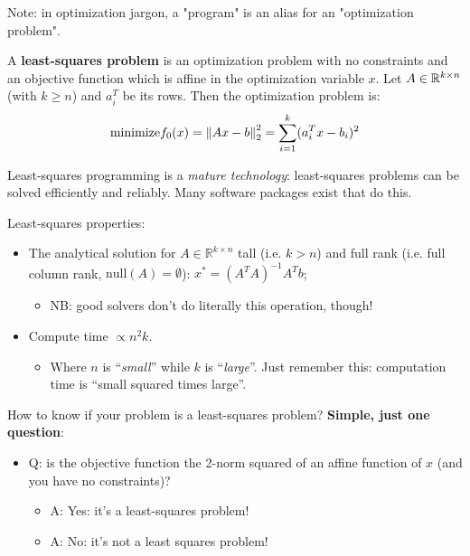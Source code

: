 \begin{Fact}
  Note: in optimization jargon, a "program" is an alias for an "optimization problem".
\end{Fact}


\begin{Definition}
  A \textbf{least-squares problem} is an optimization problem with no constraints and an objective function which is affine in the optimization variable $x$. Let $A\in\mathbb R^{k\times n}$ (with $k\ge n$) and $a_i^T$ be its rows. Then the optimization problem is:
  \begin{equation*}
    \text{minimize} f_0(x) = \left\|Ax-b\right\|_{2}^2 = \sum_{i=1}^k (a_i^Tx-b_i)^2
  \end{equation*}
\end{Definition}

Least-squares programming is a \textit{mature technology}: least-squares problems can be solved efficiently and reliably. Many software packages exist that do this.

\begin{Fact}
  Least-squares properties:
  \begin{itemize}
  \item The analytical solution for $A\in\mathbb R^{k\times n}$ tall (i.e. $k>n$) and full rank (i.e. full column rank, $\text{null}(A)=\emptyset$): $x^*=(A^TA)^{-1}A^Tb$;
    \begin{itemize}
    \item NB: good solvers don't do literally this operation, though!
    \end{itemize}
  \item Compute time $\propto n^2k$.
    \begin{itemize}
    \item Where $n$ is ``\textit{small}'' while $k$ is ``\textit{large}''. Just remember this: computation time is ``small squared times large''.
    \end{itemize}
  \end{itemize}
\end{Fact}

How to know if your problem is a least-squares problem? \textbf{Simple, just one question}:

\begin{itemize}
\item Q: is the objective function the 2-norm squared of an affine function of $x$ (and you have no constraints)?
  \begin{itemize}
  \item A: Yes: it's a least-squares problem!
  \item A: No: it's not a least squares problem!
  \end{itemize}
\end{itemize}

